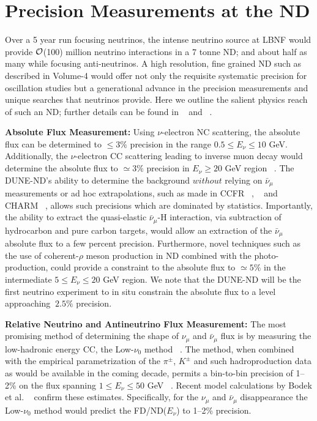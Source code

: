 \section{Precision Measurements at the ND} 
\label{sec-nd-sbp} 

\noindent
Over a 5 year run focusing neutrinos,  the intense neutrino source at LBNF would provide 
${\cal {O}}$(100) million neutrino interactions in a 7 tonne ND; 
and about half as many while focusing anti-neutrinos. 
A high resolution, fine grained ND such as described in Volume-4 would offer not only the requisite systematic 
precision for  oscillation studies but a generational advance in the precision measurements and unique 
searches  that neutrinos provide. Here we outline the salient physics reach of such an ND; further details can be 
found in ~\cite{DPR} and ~\cite{LBNE-SCI}. 

\vspace{0.25cm} 
\noindent 
{\bf Absolute Flux Measurement:} Using  $\nu$-electron NC scattering, the absolute flux can be determined 
to $\leq 3\%$ precision in the range $0.5 \leq E_\nu \leq 10$ GeV. Additionally, the $\nu$-electron CC scattering leading to  inverse 
muon decay would determine the absolute flux to $\simeq 3\%$ precision in $E_\nu \geq 20$ GeV region 
~\cite{ABS-FLUX}. 
The DUNE-ND's ability to determine the background $without$ relying on $\bar \nu_\mu$ measurements or 
ad hoc extrapolations, such as made in CCFR ~\cite{CCFR-IMD-Mishra-89}, ~\cite{CCFR-IMD-Mishra-90} 
and CHARM ~\cite{CHARM-IMD-95}, allows such precisions which are dominated by statistics. 
Importantly, the ability to extract the quasi-elastic 
$\bar \nu_\mu$-H interaction, via subtraction of hydrocarbon and pure carbon targets, would allow an extraction of 
the $\bar \nu_\mu$ absolute flux to a few percent precision. Furthermore, novel techniques such as the use of 
coherent-$\rho$ meson production in ND combined with the photo-production, could provide a constraint 
to the absolute flux to $\simeq 5\%$ in the intermediate $5 \leq E_\nu \leq 20$ GeV region. 
We note that the DUNE-ND will be the first neutrino experiment to in situ constrain the absolute flux 
to a level approaching $~2.5\%$ precision. 

\vspace{0.25cm} 
 
\noindent 
{\bf Relative Neutrino and Antineutrino Flux Measurement:} The most promising method of determining 
the shape of  $\nu_\mu$ and $\bar \nu_\mu$ flux is by measuring the low-hadronic energy CC, the Low-$\nu_0$ method ~\cite{MISHRA-Nu0}. The method, when combined with the empirical parametrization of the $\pi^{\pm}$, $K^{\pm}$ 
and such hadroproduction data as would be available in the coming decade, permits a bin-to-bin precision of 1--2\% on 
the flux spanning $1 \leq E_\nu \leq 50$ GeV ~\cite{ND-REL-FLUX}. 
Recent model calculations by Bodek et al. ~\cite{BODEK-Nu0} confirm these estimates. 
Specifically, for the $\nu_\mu$ and $\bar \nu_\mu$ disappearance the Low-$\nu_0$ method would predict the 
FD/ND($E_\nu$) to 1--2\% precision. 

